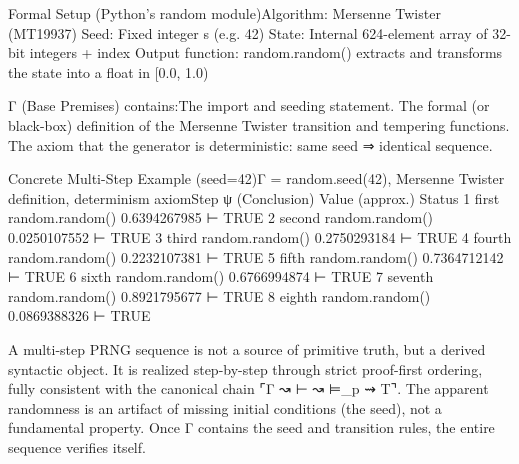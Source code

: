 Formal Setup (Python’s random module)Algorithm: Mersenne Twister (MT19937)
Seed: Fixed integer s (e.g. 42)
State: Internal 624-element array of 32-bit integers + index
Output function: random.random() extracts and transforms the state into a float in [0.0, 1.0)

Γ (Base Premises) contains:The import and seeding statement.
The formal (or black-box) definition of the Mersenne Twister transition and tempering functions.
The axiom that the generator is deterministic: same seed ⇒ identical sequence.

Concrete Multi-Step Example (seed=42)Γ = {random.seed(42), Mersenne Twister definition, determinism axiom}Step
ψ (Conclusion)
Value (approx.)
Status
1 first random.random()
0.6394267985
⊢ TRUE
2 second random.random()
0.0250107552
⊢ TRUE
3 third random.random()
0.2750293184
⊢ TRUE
4 fourth random.random()
0.2232107381
⊢ TRUE
5 fifth random.random()
0.7364712142
⊢ TRUE
6 sixth random.random()
0.6766994874
⊢ TRUE
7 seventh random.random()
0.8921795677
⊢ TRUE
8 eighth random.random()
0.0869388326
⊢ TRUE

A multi-step PRNG sequence is not a source of primitive truth, but a derived syntactic object.
It is realized step-by-step through strict proof-first ordering, fully consistent with the canonical chain ⌜Γ ↝ ⊢ ↝ ⊨_p ⇝ T⌝.
The apparent randomness is an artifact of missing initial conditions (the seed), not a fundamental property. 
Once Γ contains the seed and transition rules, the entire sequence verifies itself.


